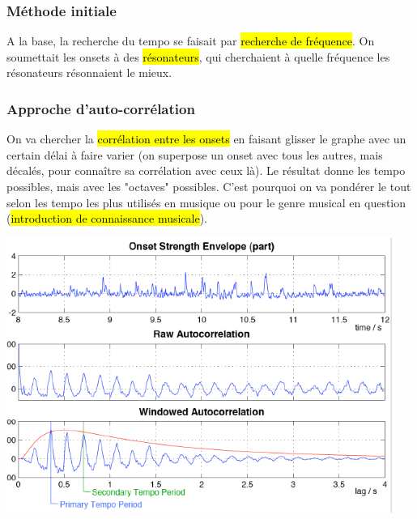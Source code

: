 \documentclass[letterpaper, 12pt]{article}
\newcommand{\alinea}{
\hspace*{0.5cm}}
\begin{document}
			\subsubsection{Méthode initiale}
				\alinea A la base, la recherche du tempo se faisait par \hl{recherche de fréquence}. On soumettait les onsets à des
					\hl{résonateurs}, qui cherchaient à quelle fréquence les résonateurs résonnaient le mieux. 				
			\subsubsection{Approche d'auto-corrélation}
				\alinea On va chercher la\hl{ corrélation entre les onsets} en faisant glisser le graphe avec un certain délai à faire varier 
					(on superpose un onset avec tous les autres, mais décalés, pour connaître sa corrélation avec ceux là). 
					Le résultat donne les tempo possibles, mais avec les "octaves"
					possibles. C'est pourquoi on va pondérer le tout selon les tempo les plus utilisés en musique ou pour le genre musical en
					question (\hl{introduction de connaissance musicale}).
				\begin{center}
					\includegraphics[width=5in]{Images/tempo3}
				\end{center}
\end{document}
